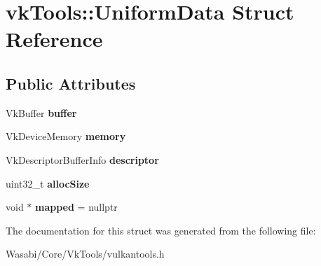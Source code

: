 \hypertarget{structvk_tools_1_1_uniform_data}{}\section{vk\+Tools\+:\+:Uniform\+Data Struct Reference}
\label{structvk_tools_1_1_uniform_data}
\subsection*{Public Attributes}
\begin{DoxyCompactItemize}
\item 
Vk\+Buffer {\bfseries buffer}\hypertarget{structvk_tools_1_1_uniform_data_ac35ad0a04e94413a205298a3995d9c04}{}\label{structvk_tools_1_1_uniform_data_ac35ad0a04e94413a205298a3995d9c04}

\item 
Vk\+Device\+Memory {\bfseries memory}\hypertarget{structvk_tools_1_1_uniform_data_a32980303308cf47851479496d4fe5bea}{}\label{structvk_tools_1_1_uniform_data_a32980303308cf47851479496d4fe5bea}

\item 
Vk\+Descriptor\+Buffer\+Info {\bfseries descriptor}\hypertarget{structvk_tools_1_1_uniform_data_a310ee6a221ce7d45f0ac9fe09982feee}{}\label{structvk_tools_1_1_uniform_data_a310ee6a221ce7d45f0ac9fe09982feee}

\item 
uint32\+\_\+t {\bfseries alloc\+Size}\hypertarget{structvk_tools_1_1_uniform_data_a67d92bcb006569e8cfe7f52bb5e9e3eb}{}\label{structvk_tools_1_1_uniform_data_a67d92bcb006569e8cfe7f52bb5e9e3eb}

\item 
void $\ast$ {\bfseries mapped} = nullptr\hypertarget{structvk_tools_1_1_uniform_data_a5582e069d5a67dbc28dd989f097f2c65}{}\label{structvk_tools_1_1_uniform_data_a5582e069d5a67dbc28dd989f097f2c65}

\end{DoxyCompactItemize}


The documentation for this struct was generated from the following file\+:\begin{DoxyCompactItemize}
\item 
Wasabi/\+Core/\+Vk\+Tools/vulkantools.\+h\end{DoxyCompactItemize}
